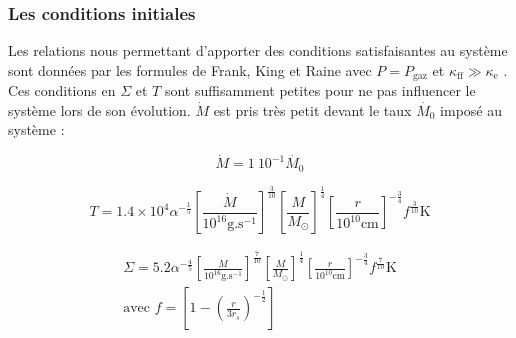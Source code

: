 \subsubsection{Les conditions initiales}

Les relations nous permettant d'apporter des conditions satisfaisantes au
système sont données par les formules de Frank, King et Raine avec $P =
P_\textrm{gaz}$ et $\kappa_\textrm{ff} \gg \kappa_\textrm{e}$
\cite{F_K_R-1985}. Ces conditions en $\Sigma$ et $T$ sont suffisamment petites
pour ne pas influencer le système lors de son évolution. $\dot{M}$ est pris
très petit devant  le taux $\dot{M_{0}}$ imposé au système : 

\begin{equation}
	\dot{M} = 1\ 10^{-1 }\dot{M_{0}}
\end{equation} 

\begin{equation}
	T = 1.4 \times 10^{4} \alpha^{- \frac{1}{5}} \left[ \frac{\dot{M}}{10^{16} \mathrm{g.s}^{-1}} \right]^{\frac{3}{10}} \left[ \frac{M}{M_\odot}\right]^{\frac{1}{4}} \left[ \frac{r}{10^{10}\mathrm{cm}}\right]^{- \frac{3}{4}} f^{\frac{3}{10}} \mathrm{K} 
\end{equation}

\begin{align}
	\Sigma = 5.2 \alpha^{- \frac{4}{5}} \left[ \frac{\dot{M}}{10^{16} \mathrm{g.s}^{-1}} \right]^{\frac{7}{10}} \left[ \frac{M}{M_\odot}\right]^{\frac{1}{4}} \left[ \frac{r}{10^{10} \mathrm{cm}}\right]^{- \frac{3}{4}} f^{\frac{7}{10}} \mbox{K}  \\ 
	\text{avec } f = \left[ 1 - \left( \frac{r}{3 r_{s}}\right)^{- \frac{1}{2}}\right]
\end{align}


